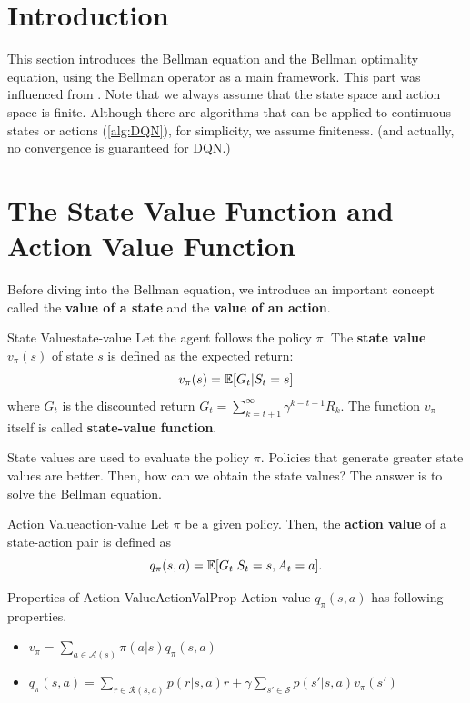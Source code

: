 \section{Introduction}
    This section introduces the Bellman equation and the Bellman optimality equation,
    using the Bellman operator as a main framework. This part was influenced from \cite{littman1996}.
    Note that we always assume that the state space and action space is finite. Although there are algorithms that can be applied to continuous states or actions (\ref{alg:DQN}),
    for simplicity, we assume finiteness. (and actually, no convergence is guaranteed for DQN.)
\section{The State Value Function and Action Value Function}
    Before diving into the Bellman equation, we introduce an important concept called the \textbf{value of a state} and the \textbf{value of an action}.
    \begin{defn}{State Value}{state-value}
        Let the agent follows the policy $\pi$. The \textbf{state value} $v_\pi(s)$ of state $s$ is defined as the expected return:
        \begin{equation}
            v_\pi(s) = \mathbb{E}[G_t|S_t=s] \label{eq:state-value}
        \end{equation}
        where $G_t$ is the discounted return $G_t=\sum_{k=t+1}^{\infty}\gamma^{k-t-1}R_{k}$.
        The function $v_\pi$ itself is called \textbf{state-value function}.
    \end{defn}
    State values are used to evaluate the policy $\pi$. Policies that generate greater state values are better. Then, how can we
    obtain the state values? The answer is to solve the Bellman equation.
    \begin{defn}{Action Value}{action-value}
        Let $\pi$ be a given policy. Then, the \textbf{action value} of a state-action pair is defined as
        \begin{equation}
            q_\pi(s,a) = \mathbb{E}[G_t|S_t=s,A_t=a].
        \end{equation}
    \end{defn}
    \begin{rem}{Properties of Action Value}{ActionValProp}
        Action value $q_\pi(s,a)$ has following properties.
        \begin{itemize}
            \item $v_\pi=\sum_{a \in \mathcal{A}(s)} \pi(a|s)q_\pi(s,a)$
            \item $q_\pi(s,a) = \sum_{r \in \mathcal{R}(s,a)}p(r|s,a)r + \gamma \sum_{s' \in \mathcal{S}}p(s'|s,a)v_\pi(s')$
        \end{itemize}
    \end{rem}
